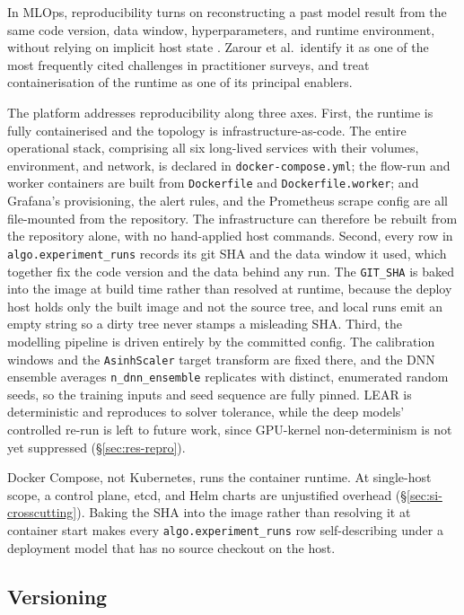 In MLOps, reproducibility turns on reconstructing a past model result from the
same code version, data window, hyperparameters, and runtime environment,
without relying on implicit host state \cite{zarour2025}. Zarour et al.\ identify it as one of the most frequently
cited challenges in practitioner surveys, and treat containerisation of the
runtime as one of its principal enablers.

The platform addresses reproducibility along three axes. First, the runtime is
fully containerised and the topology is infrastructure-as-code. The entire
operational stack, comprising all six long-lived services with their volumes,
environment, and network, is declared in \texttt{docker-compose.yml}; the
flow-run and worker containers are built from \texttt{Dockerfile} and
\texttt{Dockerfile.worker}; and Grafana's provisioning, the alert rules, and the
Prometheus scrape config are all file-mounted from the repository. The
infrastructure can therefore be rebuilt from the repository alone, with no
hand-applied host commands. Second, every row in \texttt{algo.experiment\_runs} records its
git SHA and the data window it used, which together fix the code version and the
data behind any run. The \texttt{GIT\_SHA} is baked into the image at
build time rather than resolved at runtime, because the deploy host holds only
the built image and not the source tree, and local runs emit an empty string so
a dirty tree never stamps a misleading SHA. Third, the modelling pipeline is driven entirely by the committed config.
The calibration windows and the \texttt{AsinhScaler} target transform are
fixed there, and the DNN ensemble averages
\texttt{n\_dnn\_ensemble} replicates with distinct, enumerated random seeds, so
the training inputs and seed sequence are fully pinned. LEAR is deterministic
and reproduces to solver tolerance, while the deep models' controlled re-run is
left to future work, since GPU-kernel non-determinism is not yet suppressed
(\S\ref{sec:res-repro}).

Docker Compose, not Kubernetes, runs the container runtime. At single-host
scope, a control plane, etcd, and Helm charts are unjustified overhead
(\S\ref{sec:si-crosscutting}). Baking the
SHA into the image rather than resolving it at container start makes every
\texttt{algo.experiment\_runs} row self-describing under a deployment model that
has no source checkout on the host.

\subsection{Versioning}

